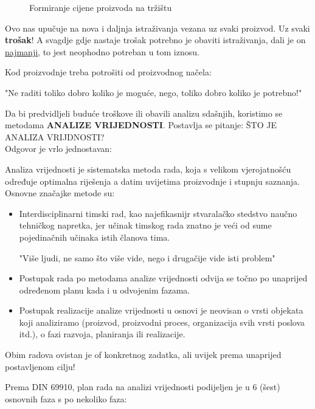 \documentclass[a4paper,12pt]{article}
\numberwithin{figure}{section}
\begin{document}
\begin{figure}
\centering
 
\caption{Formiranje cijene proizvoda na tržištu}\label{Slika1}
\end{figure}
\FloatBarrier
\par
Ovo nas upučuje na nova i daljnja istraživanja vezana uz svaki proizvod. Uz svaki \textbf{trošak}! A svagdje gdje nastaje trošak potrebno je obaviti istraživanja, dali je on \underline{najmanji}, to jest neophodno potreban u tom iznosu.\par
Kod proizvodnje treba potrošiti od proizvodnog načela:
\begin{center}
"Ne raditi toliko dobro koliko je moguće, nego, toliko dobro koliko je potrebno!"
\end{center}
\par
Da bi predvidljeli buduće troškove ili obavili analizu sdašnjih, koristimo se metodama \textbf{ANALIZE VRIJEDNOSTI}. Postavlja se pitanje: ŠTO JE ANALIZA VRIJDNOSTI?\\
Odgovor je vrlo jednostavan:\par
Analiza vrijednosti je sistematska metoda rada, koja s velikom vjerojatnošću određuje optimalna riješenja a datim uvijetima proizvodnje i stupnju saznanja. \\
Osnovne značajke metode su:
\begin{itemize}
\item Interdisciplinarni timski rad, kao najefikasnijr stvaralačko stedstvo naučno tehničkog napretka, jer učinak timskog rada znatno je veći od sume pojedinačnih učinaka istih članova tima.
\begin{center}
"Više ljudi, ne samo što više vide, nego i drugačije vide isti problem"
\end{center}
\item Postupak rada po metodama analize vrijednosti odvija se točno po unaprijed  određenom planu kada i u odvojenim fazama.
\item Postupak realizacije analize vrijednosti u osnovi je neovisan o vrsti objekata koji analiziramo (proizvod, proizvodni proces, organizacija svih vrsti poslova itd.), o fazi razvoja, planiranja ili realizacije.
\end{itemize}
\par
Obim radova ovistan je of konkretnog zadatka, ali uvijek prema unaprijed postavljenom cilju!
\par
Prema DIN 69910, plan rada na analizi vrijednosti podijeljen je u 6 (šest) osnovnih faza s po nekoliko faza:
\end{document}
